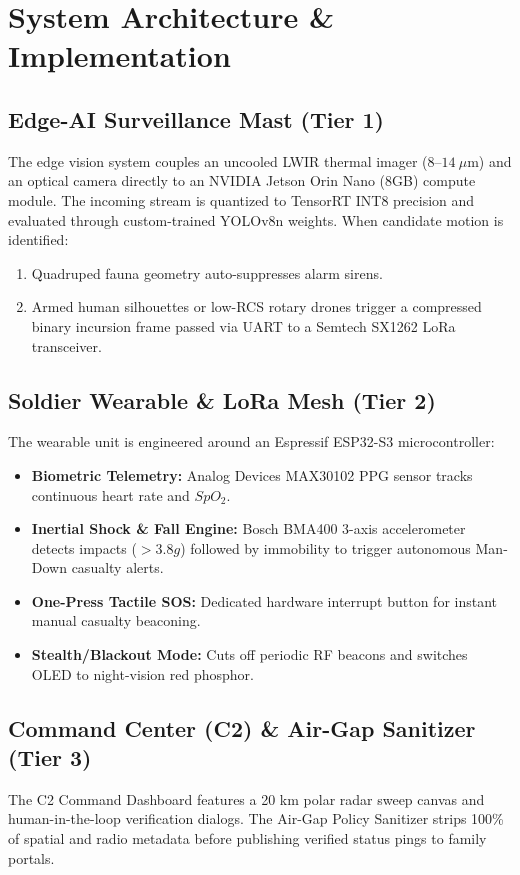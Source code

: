 \documentclass[conference]{IEEEtran}
\begin{document}
\section{System Architecture \& Implementation}
\subsection{Edge-AI Surveillance Mast (Tier 1)}
The edge vision system couples an uncooled LWIR thermal imager ($8$--$14\ \mu$m) and an optical camera directly to an NVIDIA Jetson Orin Nano (8GB) compute module. The incoming stream is quantized to TensorRT INT8 precision and evaluated through custom-trained YOLOv8n weights. When candidate motion is identified:
\begin{enumerate}
    \item Quadruped fauna geometry auto-suppresses alarm sirens.
    \item Armed human silhouettes or low-RCS rotary drones trigger a compressed binary incursion frame passed via UART to a Semtech SX1262 LoRa transceiver.
\end{enumerate}

\subsection{Soldier Wearable \& LoRa Mesh (Tier 2)}
The wearable unit is engineered around an Espressif ESP32-S3 microcontroller:
\begin{itemize}
    \item \textbf{Biometric Telemetry:} Analog Devices MAX30102 PPG sensor tracks continuous heart rate and $SpO_2$.
    \item \textbf{Inertial Shock \& Fall Engine:} Bosch BMA400 3-axis accelerometer detects impacts ($>3.8g$) followed by immobility to trigger autonomous Man-Down casualty alerts.
    \item \textbf{One-Press Tactile SOS:} Dedicated hardware interrupt button for instant manual casualty beaconing.
    \item \textbf{Stealth/Blackout Mode:} Cuts off periodic RF beacons and switches OLED to night-vision red phosphor.
\end{itemize}

\subsection{Command Center (C2) \& Air-Gap Sanitizer (Tier 3)}
The C2 Command Dashboard features a 20 km polar radar sweep canvas and human-in-the-loop verification dialogs. The Air-Gap Policy Sanitizer strips 100\% of spatial and radio metadata before publishing verified status pings to family portals.
\end{document}
